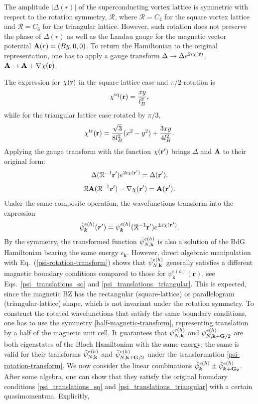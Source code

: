 \documentclass[10pt,prb,aps,superscriptaddress,amsmath,amssymb,twocolumn,floatfix,longbibliography]{revtex4-1}
\newcommand{\be}{\begin{equation} }
\newcommand{\ee}{\end{equation}}
\newcommand{\bk}{{\bf k}}
\newcommand{\bA}{{\bf A}}
\newcommand{\br}{{\bf r}}
\newcommand{\bG}{{\bf G}}
\newcommand{\R}{\mathcal{R}}
\begin{document}
The amplitude $|\Delta(r)|$ of the superconducting vortex lattice is symmetric with respect to the rotation symmetry, $\R$, where $\R = C_4$ for the square vortex lattice and $\R = C_6$ for the triangular lattice. However, such rotation does not preserve the phase of $\Delta(r)$ as well as the Landau gauge for the magnetic vector potential  $\bA(r) = (By,0,0)$. To return the Hamiltonian to the original representation, one has to apply a gauge transform $\Delta \rightarrow \Delta e^{2i\chi(\br)}$, $\bA \rightarrow \bA + \nabla \chi(\br)$. 

The expression for $\chi(\br)$ in the square-lattice case and $\pi/2$-rotation is
\be
    \chi^{\text{sq}}(\br) = \frac{xy}{l_B^2},
\ee
while for the triangular lattice case rotated by $\pi/3$,
\be
    \chi^{\text{tr}}(\br) = \frac{\sqrt{3}}{8l_B^2}(x^2 - y^2) + \frac{3xy}{4l_B^2}.
\ee
Applying the gauge transform with the function $\chi(\br')$ brings $\Delta$ and $\bA$ to their original form:
\be
    \Delta(\R^{-1} \br') e^{2i \chi(\br')} = \Delta(\br'),
\ee
\be
    \R \bA(\R^{-1}\br') - \nabla \chi(\br') = \bA (\br') .
\ee
Under the same composite operation, the wavefunctions transform into the expression
\be \label{psi-rotation-transform}
    \tilde{\psi}_{\bm{\bm{k}}}^{e(h)}(\bm{r}') = \psi_{\bm{k}}^{e(h)}(\R^{-1} \br') e^{\pm i \chi(\bm{r'})}.
\ee
By the symmetry, the transformed function $\tilde{\psi}_{N, \bk}^{e(h)}$ is also a solution of the BdG Hamiltonian bearing the same energy $\epsilon_{\bm{k}}$. However, direct algebraic manipulation with Eq.~(\ref{psi-rotation-transform}) shows that $\tilde{\psi}_{N, \bk}^{e(h)}$ generally satisfies a different magnetic boundary conditions compared to those for $\psi_{\bm{\bm{k}}}^{e(h)}(\bm{r})$, see Eqs.~\eqref{psi_translations_sq} and \eqref{psi_translations_triangular}. This is expected, since the magnetic BZ has the rectangular (square-lattice) or parallelogram (triangular-lattice) shape, which is not invariant under the rotation symmetry. 
To construct the rotated wavefunctions that satisfy the same boundary conditions, one has to use the symmetry \eqref{half-magnetic-transform}, representing translation by a half of the magnetic unit cell. It guarantees that $\psi_{N, \bk}^{e(h)}$ and $\psi_{N, \bk + \bG /2}^{e(h)}$ are both eigenstates of the Bloch Hamiltonian with the same energy; the same is valid for their transforms $\tilde{\psi}_{N, \bk}^{e(h)}$ and $\tilde{\psi}_{N, \bk + \bG /2}^{e(h)}$ under the transformation \eqref{psi-rotation-transform}. We now consider the linear combinations $\tilde{\psi}_{\bm{\bm{k}}}^{e(h)} \pm  \tilde{\psi}_{\bm{\bm{k}+\bG_2}}^{e(h)}$. After some algebra, one can show that they  satisfy the original boundary conditions \eqref{psi_translations_sq} and \eqref{psi_translations_triangular} with a certain quasimomentum. Explicitly,
\end{document}
